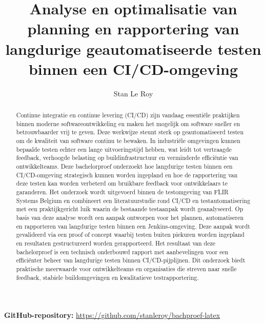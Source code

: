 \documentclass{hogent-article}
\title{Analyse en optimalisatie van planning en rapportering van langdurige geautomatiseerde testen binnen een CI/CD-omgeving}
\author{Stan Le Roy}
\begin{document}
\begin{abstract}
Continue integratie en continue levering (CI/CD) zijn vandaag essentiële
praktijken binnen moderne softwareontwikkeling en maken het mogelijk om
software sneller en betrouwbaarder vrij te geven. Deze werkwijze steunt
sterk op geautomatiseerd testen om de kwaliteit van software continu te
bewaken. In industriële omgevingen kunnen bepaalde testen echter een lange
uitvoeringstijd hebben, wat leidt tot vertraagde feedback, verhoogde
belasting op buildinfrastructuur en verminderde efficiëntie van
ontwikkelteams.
Deze bachelorproef onderzoekt hoe langdurige testen binnen een
CI/CD-omgeving strategisch kunnen worden ingepland en hoe de rapportering
van deze testen kan worden verbeterd om bruikbare feedback voor
ontwikkelaars te garanderen. Het onderzoek wordt uitgevoerd binnen de
testomgeving van FLIR Systems Belgium en combineert een literatuurstudie
rond CI/CD en testautomatisering met een praktijkgericht luik waarin de
bestaande testaanpak wordt geanalyseerd.
Op basis van deze analyse wordt een aanpak ontworpen voor het plannen,
automatiseren en rapporteren van langdurige testen binnen een
Jenkins-omgeving. Deze aanpak wordt gevalideerd via een proof of concept
waarbij testen buiten piekuren worden ingepland en resultaten
gestructureerd worden gerapporteerd. Het resultaat van deze bachelorproef
is een technisch onderbouwd rapport met aanbevelingen voor een efficiënter
beheer van langdurige testen binnen CI/CD-pijplijnen. Dit onderzoek biedt
praktische meerwaarde voor ontwikkelteams en organisaties die streven naar
snelle feedback, stabiele buildomgevingen en kwalitatieve
testrapportering.
\end{abstract}

\noindent\textbf{GitHub-repository:}
\url{https://github.com/stanleroy/bachproef-latex}

\tableofcontents


\nocite{*}
\printbibliography[heading=bibintoc]
\end{document}
